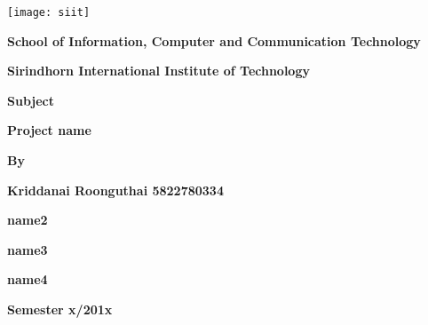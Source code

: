 \begin{titlepage}
    \begin{center}
    \large
    	\begin{center}
	\texttt{[image: siit]}
	\end{center}
	\vspace{0.5cm}
        \textbf{School of Information, Computer and Communication Technology} \par
        \vspace{0.5cm}

        \textbf{Sirindhorn International Institute of Technology}

        \vspace{3cm}

        \vspace{0.5cm}

        \textbf{Subject}
        \vspace{0.5cm}

        \textbf{Project name}

        \vspace{2cm}
        \textbf{By}
        \vspace{0.5cm}

        \textbf{Kriddanai Roonguthai 5822780334}
        \vspace{0.25cm}

        \textbf{name2}
        \vspace{0.25cm}

        \textbf{name3}
        \vspace{0.25cm}

        \textbf{name4}
        \vspace{0.25cm}

        \vspace{3cm}
        \textbf{Semester x/201x}
    \end{center}
\end{titlepage}
